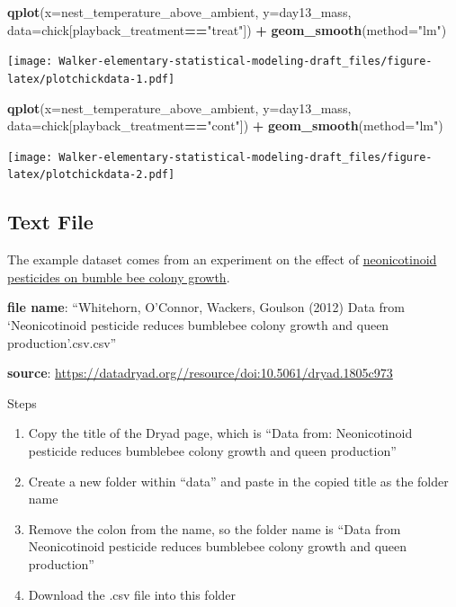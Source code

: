 \documentclass[]{book}
\newenvironment{Shaded}{\begin{snugshade}}{\end{snugshade}}
\newcommand{\KeywordTok}[1]{\textcolor[rgb]{0.13,0.29,0.53}{\textbf{#1}}}
\newcommand{\DataTypeTok}[1]{\textcolor[rgb]{0.13,0.29,0.53}{#1}}
\newcommand{\StringTok}[1]{\textcolor[rgb]{0.31,0.60,0.02}{#1}}
\newcommand{\OperatorTok}[1]{\textcolor[rgb]{0.81,0.36,0.00}{\textbf{#1}}}
\newcommand{\NormalTok}[1]{#1}
\providecommand{\tightlist}{%
  \setlength{\itemsep}{0pt}\setlength{\parskip}{0pt}}
\begin{document}
\begin{Shaded}
\begin{Highlighting}[]
\KeywordTok{qplot}\NormalTok{(}\DataTypeTok{x=}\NormalTok{nest_temperature_above_ambient, }\DataTypeTok{y=}\NormalTok{day13_mass, }\DataTypeTok{data=}\NormalTok{chick[playback_treatment}\OperatorTok{==}\StringTok{"treat"}\NormalTok{]) }\OperatorTok{+}
\StringTok{  }\KeywordTok{geom_smooth}\NormalTok{(}\DataTypeTok{method=}\StringTok{"lm"}\NormalTok{)}
\end{Highlighting}
\end{Shaded}

\texttt{[image: Walker-elementary-statistical-modeling-draft\_files/figure-latex/plotchickdata-1.pdf]}

\begin{Shaded}
\begin{Highlighting}[]
\KeywordTok{qplot}\NormalTok{(}\DataTypeTok{x=}\NormalTok{nest_temperature_above_ambient, }\DataTypeTok{y=}\NormalTok{day13_mass, }\DataTypeTok{data=}\NormalTok{chick[playback_treatment}\OperatorTok{==}\StringTok{"cont"}\NormalTok{]) }\OperatorTok{+}
\StringTok{  }\KeywordTok{geom_smooth}\NormalTok{(}\DataTypeTok{method=}\StringTok{"lm"}\NormalTok{)}
\end{Highlighting}
\end{Shaded}

\texttt{[image: Walker-elementary-statistical-modeling-draft\_files/figure-latex/plotchickdata-2.pdf]}

\subsection{Text File}\label{text-file}

The example dataset comes from an experiment on the effect of
\href{http://science.sciencemag.org/content/early/2012/03/28/science.1215025}{neonicotinoid
pesticides on bumble bee colony growth}.

\textbf{file name}: ``Whitehorn, O'Connor, Wackers, Goulson (2012) Data
from `Neonicotinoid pesticide reduces bumblebee colony growth and queen
production'.csv.csv''

\textbf{source}:
\url{https://datadryad.org//resource/doi:10.5061/dryad.1805c973}

Steps

\begin{enumerate}
\def\labelenumi{\arabic{enumi}.}
\tightlist
\item
  Copy the title of the Dryad page, which is ``Data from: Neonicotinoid
  pesticide reduces bumblebee colony growth and queen production''
\item
  Create a new folder within ``data'' and paste in the copied title as
  the folder name
\item
  Remove the colon from the name, so the folder name is ``Data from
  Neonicotinoid pesticide reduces bumblebee colony growth and queen
  production''
\item
  Download the .csv file into this folder
\end{enumerate}
\end{document}
